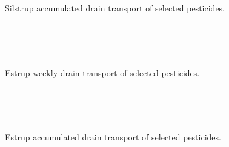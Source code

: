 \begin{figure}[htbp]
  \begin{center}
    \\
    \\
  \end{center}
  \caption{Silstrup accumulated drain transport of selected pesticides.}
  \label{fig:Silstrup-acc}
\end{figure}

\begin{figure}[htbp]
  \begin{center}
    \\
    \\
    \\
  \end{center}
  \caption{Estrup weekly drain transport of selected pesticides.}
  \label{fig:Estrup-weekly}
\end{figure}

\begin{figure}[htbp]
  \begin{center}
    \\
    \\
    \\
  \end{center}
  \caption{Estrup accumulated drain transport of selected pesticides.}
  \label{fig:Estrup-acc}
\end{figure}


